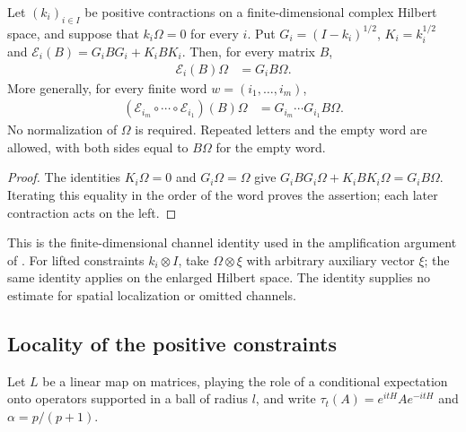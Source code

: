 \begin{theorem}
    \label{thm:root_channel_word_vector}
    \leanok
    Let $(k_i)_{i\in I}$ be positive contractions on a finite-dimensional
    complex Hilbert space, and suppose that $k_i\Omega=0$ for every $i$.
    Put $G_i=(I-k_i)^{1/2}$, $K_i=k_i^{1/2}$ and
    $\mathcal E_i(B)=G_iBG_i+K_iBK_i$. Then, for every matrix $B$,
    \begin{align}
        \mathcal E_i(B)\Omega & =G_iB\Omega.
    \end{align}
    More generally, for every finite word $w=(i_1,\ldots,i_m)$,
    \begin{align}
        (\mathcal E_{i_m}\circ\cdots\circ\mathcal E_{i_1})(B)\Omega
         & =G_{i_m}\cdots G_{i_1}B\Omega.
    \end{align}
    No normalization of $\Omega$ is required. Repeated letters and the empty
    word are allowed, with both sides equal to $B\Omega$ for the empty word.
\end{theorem}
\begin{proof}\leanok
    The identities $K_i\Omega=0$ and $G_i\Omega=\Omega$ give
    $G_iBG_i\Omega+K_iBK_i\Omega=G_iB\Omega$.
    Iterating this equality in the order of the word proves the assertion;
    each later contraction acts on the left.
\end{proof}

This is the finite-dimensional channel identity used in the amplification
argument of \cite{OpenAI2026AreaLaw}.
For lifted constraints $k_i\otimes I$, take $\Omega\otimes\xi$ with arbitrary
auxiliary vector $\xi$; the same identity applies on the enlarged Hilbert space.
The identity supplies no estimate for spatial localization or omitted channels.

\subsection{Locality of the positive constraints}
\label{sec:positive_locality}

Let $L$ be a linear map on matrices, playing the role of a conditional
expectation onto operators supported in a ball of radius $l$, and write
$\tau_t(A)=e^{itH}Ae^{-itH}$ and $\alpha=p/(p+1)$.

